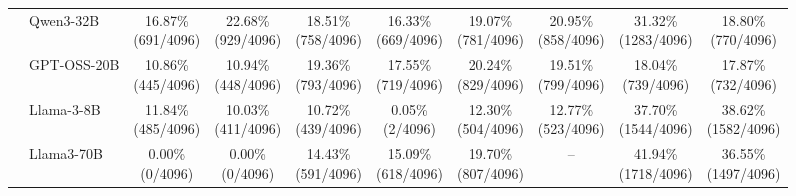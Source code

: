 \begin{table}[t]
{\begin{tabular}{ll*{8}{c}}
 & Qwen3-32B & \makecell[c]{16.87\%\\[-1pt]\scriptsize(691/4096)} & \makecell[c]{22.68\%\\[-1pt]\scriptsize(929/4096)} & \makecell[c]{18.51\%\\[-1pt]\scriptsize(758/4096)} & \makecell[c]{16.33\%\\[-1pt]\scriptsize(669/4096)} & \makecell[c]{19.07\%\\[-1pt]\scriptsize(781/4096)} & \makecell[c]{20.95\%\\[-1pt]\scriptsize(858/4096)} & \makecell[c]{31.32\%\\[-1pt]\scriptsize(1283/4096)} & \makecell[c]{18.80\%\\[-1pt]\scriptsize(770/4096)} \\
 & GPT-OSS-20B & \makecell[c]{10.86\%\\[-1pt]\scriptsize(445/4096)} & \makecell[c]{10.94\%\\[-1pt]\scriptsize(448/4096)} & \makecell[c]{19.36\%\\[-1pt]\scriptsize(793/4096)} & \makecell[c]{17.55\%\\[-1pt]\scriptsize(719/4096)} & \makecell[c]{20.24\%\\[-1pt]\scriptsize(829/4096)} & \makecell[c]{19.51\%\\[-1pt]\scriptsize(799/4096)} & \makecell[c]{18.04\%\\[-1pt]\scriptsize(739/4096)} & \makecell[c]{17.87\%\\[-1pt]\scriptsize(732/4096)} \\
 & Llama-3-8B & \makecell[c]{11.84\%\\[-1pt]\scriptsize(485/4096)} & \makecell[c]{10.03\%\\[-1pt]\scriptsize(411/4096)} & \makecell[c]{10.72\%\\[-1pt]\scriptsize(439/4096)} & \makecell[c]{0.05\%\\[-1pt]\scriptsize(2/4096)} & \makecell[c]{12.30\%\\[-1pt]\scriptsize(504/4096)} & \makecell[c]{12.77\%\\[-1pt]\scriptsize(523/4096)} & \makecell[c]{37.70\%\\[-1pt]\scriptsize(1544/4096)} & \makecell[c]{38.62\%\\[-1pt]\scriptsize(1582/4096)} \\
 & Llama3-70B & \makecell[c]{0.00\%\\[-1pt]\scriptsize(0/4096)} & \makecell[c]{0.00\%\\[-1pt]\scriptsize(0/4096)} & \makecell[c]{14.43\%\\[-1pt]\scriptsize(591/4096)} & \makecell[c]{15.09\%\\[-1pt]\scriptsize(618/4096)} & \makecell[c]{19.70\%\\[-1pt]\scriptsize(807/4096)} & -- & \makecell[c]{41.94\%\\[-1pt]\scriptsize(1718/4096)} & \makecell[c]{36.55\%\\[-1pt]\scriptsize(1497/4096)} \\

\end{tabular}}
\end{table}
